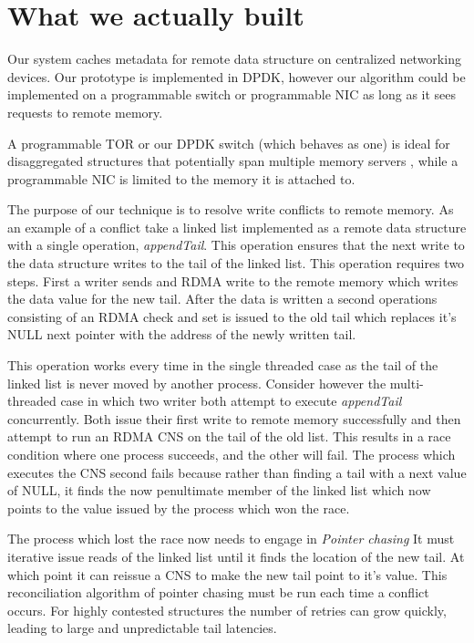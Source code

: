 \section{What we actually built}

Our system caches metadata for remote data structure on centralized
networking devices. Our prototype is implemented in DPDK, however our
algorithm could be implemented on a programmable switch or
programmable NIC as long as it sees requests to remote memory. 

A programmable TOR or our DPDK switch (which behaves as one) is ideal
for disaggregated structures that potentially span multiple memory
servers , while a programmable NIC is limited to the memory it is
attached to. 

The purpose of our technique is to resolve write conflicts to remote
memory. As an example of a conflict take a linked list implemented as
a remote data structure with a single operation, \textit{appendTail}.
This operation ensures that the next write to the data structure writes
to the tail of the linked list. This operation requires two steps.
First a writer sends and RDMA write to the remote memory which writes
the data value for the new tail. After the data is written a second
operations consisting of an RDMA check and set is issued to the old
tail which replaces it's NULL next pointer with the address of the
newly written tail.

This operation works every time in the single threaded case as the
tail of the linked list is never moved by another process. Consider
however the multi-threaded case in which two writer both attempt to
execute \textit{appendTail} concurrently. Both issue their first write
to remote memory successfully and then attempt to run an RDMA CNS on
the tail of the old list. This results in a race condition where one
process succeeds, and the other will fail. The process which executes
the CNS second fails because rather than finding a tail with a next
value of NULL, it finds the now penultimate member of the linked list
which now points to the value issued by the process which won the
race. 

The process which lost the race now needs to engage in \textit{Pointer
chasing} It must iterative issue reads of the linked list until it
finds the location of the new tail. At which point it can reissue a
CNS to make the new tail point to it's value. This reconciliation
algorithm of pointer chasing must be run each time a conflict occurs.
For highly contested structures the number of retries can grow
quickly, leading to large and unpredictable tail latencies.

